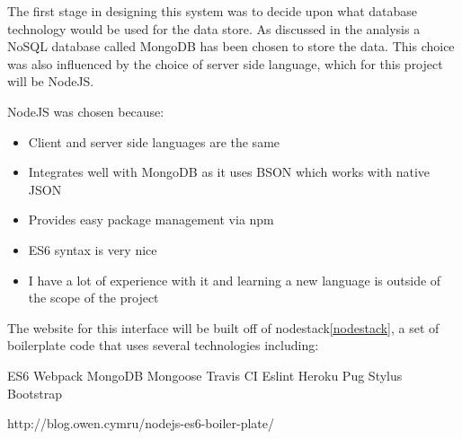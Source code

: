 The first stage in designing this system was to decide upon what database technology would be used for the data store. As discussed in the analysis a NoSQL database called MongoDB has been chosen to store the data. This choice was also influenced by the choice of server side language, which for this project will be NodeJS. 

NodeJS was chosen because:

\begin{itemize}
  \item Client and server side languages are the same
  \item Integrates well with MongoDB as it uses BSON which works with native JSON
  \item Provides easy package management via npm
  \item ES6 syntax is very nice
  \item I have a lot of experience with it and learning a new language is outside of the scope of the project
\end{itemize}

The website for this interface will be built off of nodestack\ref{nodestack}, a set of boilerplate code that uses several technologies including:

ES6
Webpack
MongoDB
Mongoose
Travis CI
Eslint
Heroku
Pug
Stylus
Bootstrap

http://blog.owen.cymru/nodejs-es6-boiler-plate/



 
